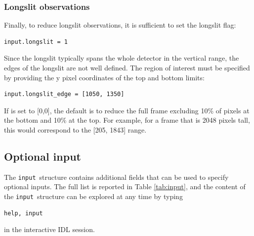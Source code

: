 \documentclass[a4paper]{article}
\newcommand{\inp}{\texttt{input}}
\begin{document}
\begin{sloppypar}
\subsubsection{Longslit observations}
Finally, to reduce longslit observations, it is sufficient to set the longslit flag:
\begin{lstlisting}
input.longslit = 1
\end{lstlisting}
Since the longslit typically spans the whole detector in the vertical range, the edges of the longslit are not well defined. The region of interest must be specified by providing the y pixel coordinates of the top and bottom limits:
\begin{lstlisting}
input.longslit_edge = [1050, 1350]
\end{lstlisting}
If  is set to [0,0], the default is to reduce the full frame excluding 10\% of pixels at the bottom and 10\% at the top. For example, for a frame that is 2048 pixels tall, this would correspond to the [205, 1843] range.


\subsection{Optional input}

The \inp\ structure contains additional fields that can be used to specify optional inputs. The full list is reported in Table \ref{tab:input}, and the content of the \inp\ structure can be explored at any time by typing
\begin{lstlisting}
help, input
\end{lstlisting}
in the interactive IDL session.


\end{sloppypar}
\end{document}
